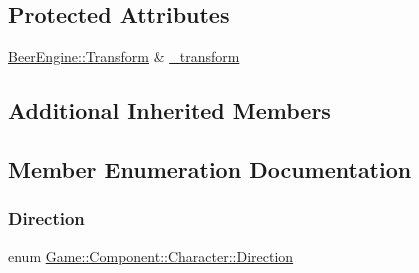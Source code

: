 \subsection*{Protected Attributes}
\begin{DoxyCompactItemize}
\item 
\mbox{\hyperlink{class_beer_engine_1_1_transform}{Beer\+Engine\+::\+Transform}} \& \mbox{\hyperlink{class_game_1_1_component_1_1_character_ad37b590fa801e454ac64be8df3ca0126}{\+\_\+transform}}
\end{DoxyCompactItemize}
\subsection*{Additional Inherited Members}


\subsection{Member Enumeration Documentation}
\mbox{\label{class_game_1_1_component_1_1_character_aa1b80f780538b76c7a948e96c54dbe87}} 
\subsubsection{\texorpdfstring{Direction}{Direction}}
{\footnotesize\ttfamily enum \mbox{\hyperlink{class_game_1_1_component_1_1_character_aa1b80f780538b76c7a948e96c54dbe87}{Game\+::\+Component\+::\+Character\+::\+Direction}}}

